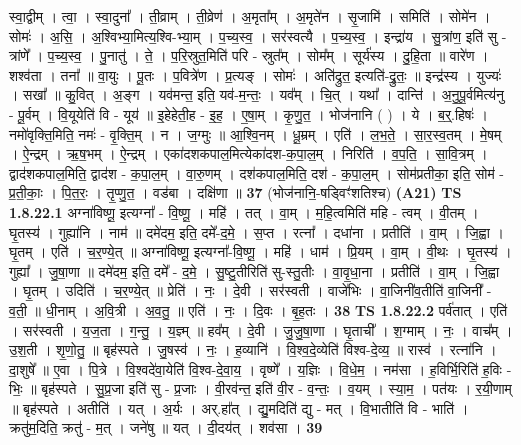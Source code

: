 \documentclass[17pt]{extarticle}
\begin{document}
                  स्वा॒द्वीम् । त्वा॒ । स्वा॒दुना᳚ । ती॒व्राम् । ती॒व्रेण॑ । अ॒मृता᳚म् । अ॒मृते॑न । सृ॒जामि॑ । समिति॑ । सोमे॑न । सोमः॑ । अ॒सि॒ । अ॒श्विभ्या॒मित्य॒श्वि-भ्या॒म् । प॒च्य॒स्व॒ । सर॑स्वत्यै । प॒च्य॒स्व॒ । इन्द्रा॑य । सु॒त्रांण॒ इति॑ सु - त्रांणे᳚ । प॒च्य॒स्व॒ । पु॒नातु॑ । ते॒ । प॒रि॒स्रुत॒मिति॑ परि - स्रुत᳚म् । सोम᳚म् । सूर्य॑स्य । दु॒हि॒ता ॥ वारे॑ण । शश्व॑ता । तना᳚ ॥ वा॒युः । पू॒तः । प॒वित्रे॑ण । प्र॒त्यङ् । सोमः॑ । अति॑द्रुत॒ इत्यति॑-द्रु॒तः॒ ॥ इन्द्र॑स्य । युज्यः॑ । सखा᳚ ॥ कु॒वित् । अ॒ङ्ग । यव॑मन्त॒ इति॒ यव॑-म॒न्तः॒ । यव᳚म् । चि॒त् । यथा᳚ । दान्ति॑ । अ॒नु॒पू॒र्वमित्य॑नु - पू॒र्वम् । वि॒यूयेति॑ वि - यूय॑ ॥ इ॒हेहेती॒ह - इ॒ह॒ । ए॒षा॒म् । कृ॒णु॒त॒ । भोज॑नानि ( ) । ये । ब॒र्॒.हिषः॑ । नमो॑वृक्ति॒मिति॒ नमः॑ - वृ॒क्ति॒म् । न । ज॒ग्मुः ॥ आ॒श्वि॒नम् । धू॒म्रम् । एति॑ । ल॒भ॒ते॒ । सा॒र॒स्व॒तम् । मे॒षम् । ऐ॒न्द्रम् । ऋ॒ष॒भम् । ऐ॒न्द्रम् । एका॑दशकपाल॒मित्येका॑दश-क॒पा॒ल॒म् । निरिति॑ । व॒प॒ति॒ । सा॒वि॒त्रम् । द्वाद॑शकपाल॒मिति॒ द्वाद॑श - क॒पा॒ल॒म् । वा॒रु॒णम् । दश॑कपाल॒मिति॒ दश॑ - क॒पा॒ल॒म् । सोम॑प्रतीका॒ इति॒ सोम॑ - प्र॒ती॒काः॒ । पि॒त॒रः॒ । तृ॒प्णु॒त॒ । वड॑बा । दक्षि॑णा ॥ \textbf{  37 } \newline
                  \newline
                      (भोज॑नानि॒-षड्विꣳ॑शतिश्च)  \textbf{(A21)} \newline \newline
                                \textbf{ TS 1.8.22.1} \newline
                  अग्ना॑विष्णू॒ इत्यग्ना᳚ - वि॒ष्णू॒ । महि॑ । तत् । वा॒म् । म॒हि॒त्वमिति॑ महि - त्वम् । वी॒तम् । घृ॒तस्य॑ । गुह्या॑नि । नाम॑ ॥ दमे॑दम॒ इति॒ दमे᳚-द॒मे॒ । स॒प्त । रत्ना᳚ । दधा॑ना । प्रतीति॑ । वा॒म् । जि॒ह्वा । घृ॒तम् । एति॑ । च॒र॒ण्ये॒त् ॥ अग्ना॑विष्णू॒ इत्यग्ना᳚-वि॒ष्णू॒ । महि॑ । धाम॑ । प्रि॒यम् । वा॒म् । वी॒थः । घृ॒तस्य॑ । गुह्या᳚ । जु॒षा॒णा ॥ दमे॑दम॒ इति॒ दमे᳚ - द॒मे॒ । सु॒ष्टु॒तीरिति॑ सु-स्तु॒तीः । वा॒वृ॒धा॒ना । प्रतीति॑ । वा॒म् । जि॒ह्वा । घृ॒तम् । उदिति॑ । च॒र॒ण्ये॒त् ॥ प्रेति॑ । नः॒ । दे॒वी । सर॑स्वती । वाजे॑भिः । वा॒जिनी॑व॒तीति॑ वा॒जिनी᳚ - व॒ती॒ ॥ धी॒नाम् । अ॒वि॒त्री । अ॒व॒तु॒ ॥ एति॑ । नः॒ । दि॒वः । बृ॒ह॒तः । \textbf{  38} \newline
                  \newline
                                \textbf{ TS 1.8.22.2} \newline
                  पर्व॑तात् । एति॑ । सर॑स्वती । य॒ज॒ता । ग॒न्तु॒ । य॒ज्ञ्म् ॥ हव᳚म् । दे॒वी । जु॒जु॒षा॒णा । घृ॒ताची᳚ । श॒ग्माम् । नः॒ । वाच᳚म् । उ॒श॒ती । शृ॒णो॒तु॒ ॥ बृह॑स्पते । जु॒षस्व॑ । नः॒ । ह॒व्यानि॑ । वि॒श्व॒दे॒व्येति॑ विश्व-दे॒व्य॒ ॥ रास्व॑ । रत्ना॑नि । दा॒शुषे᳚ ॥ ए॒वा । पि॒त्रे । वि॒श्वदे॑वा॒येति॑ वि॒श्व-दे॒वा॒य॒ । वृष्णे᳚ । य॒ज्ञिः । वि॒धे॒म॒ । नम॑सा । ह॒विर्भि॒रिति॑ ह॒विः - भिः॒ ॥ बृह॑स्पते । सु॒प्र॒जा इति॑ सु - प्र॒जाः । वी॒रव॑न्त॒ इति॑ वी॒र - व॒न्तः॒ । व॒यम् । स्या॒म॒ । पत॑यः । र॒यी॒णाम् ॥ बृह॑स्पते । अतीति॑ । यत् । अ॒र्यः । अर्.हा᳚त् । द्यु॒मदिति॑ द्यु - मत् । वि॒भातीति॑ वि - भाति॑ । क्रतु॑म॒दिति॒ क्रतु॑ - म॒त् । जने॑षु ॥ यत् । दी॒दय॑त् । शव॑सा । \textbf{  39} \newline
\end{document}
